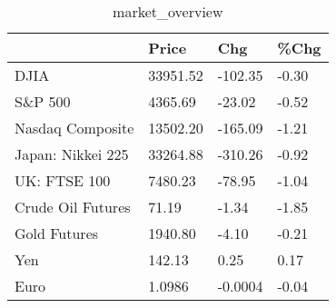 \documentclass{article}%
\begin{document}
%


\begin{table}[htbp]%
\caption{market\_overview}%
\centering%
\begin{adjustbox}{width=1\textwidth}%
\begin{tabular}{llll}
\toprule
                  &    Price &     Chg &  \%Chg \\
\midrule
             DJIA & 33951.52 & -102.35 & -0.30 \\
          S\&P 500 &  4365.69 &  -23.02 & -0.52 \\
 Nasdaq Composite & 13502.20 & -165.09 & -1.21 \\
Japan: Nikkei 225 & 33264.88 & -310.26 & -0.92 \\
     UK: FTSE 100 &  7480.23 &  -78.95 & -1.04 \\
Crude Oil Futures &    71.19 &   -1.34 & -1.85 \\
     Gold Futures &  1940.80 &   -4.10 & -0.21 \\
              Yen &   142.13 &    0.25 &  0.17 \\
             Euro &   1.0986 & -0.0004 & -0.04 \\
\bottomrule
\end{tabular}
%
\end{adjustbox}%
\end{table}

%
\end{document}

